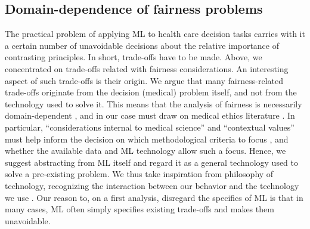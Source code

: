 \subsection{Domain-dependence of fairness problems}
    The practical problem of applying ML to health care decision tasks carries with it a certain number of unavoidable decisions about the relative importance of contrasting principles.
    In short, trade-offs have to be made.
    Above, we concentrated on trade-offs related with fairness considerations.
    An interesting aspect of such trade-offs is their origin.
    We argue that many fairness-related trade-offs originate from the decision (medical) problem itself, and not from the technology used to solve it.
    This means that the analysis of fairness is necessarily domain-dependent \cite{Fletcher2021}, and in our case must draw on medical ethics literature \cite{Morley2020}.
    In particular, ``considerations internal to medical science'' and ``contextual values'' must help inform the decision on which methodological criteria to focus \cite[p.~252]{Ho2011}, and whether the available data and ML technology allow such a focus.
    Hence, we suggest abstracting from ML itself and regard it as a general technology used to solve a pre-existing problem.
    We thus take inspiration from philosophy of technology, recognizing the interaction between our behavior and the technology we use \cite{Dijkstra2020}.
    Our reason to, on a first analysis, disregard the specifics of ML is that in many cases, ML often simply specifies existing trade-offs and makes them unavoidable.


